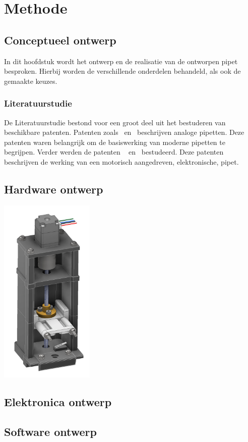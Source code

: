 \chapter{Methode}
\section{Conceptueel ontwerp}
In dit hoofdstuk wordt het ontwerp en de realisatie van de ontworpen pipet besproken. Hierbij worden de verschillende onderdelen behandeld, als ook de gemaakte keuzes. 
\subsection{Literatuurstudie}
De Literatuurstudie bestond voor een groot deel uit het bestuderen van beschikbare patenten. Patenten zoals\ \cite{RN16} en\ \cite{RN17} beschrijven analoge pipetten. Deze patenten waren belangrijk om de basiswerking van moderne pipetten te begrijpen.
Verder werden de patenten \ \cite{RN35} en\ \cite{RN36} bestudeerd. Deze patenten beschrijven de werking van een motorisch aangedreven, elektronische, pipet.
\section{Hardware ontwerp}
\begin{center}
    \includegraphics[height=9cm]{figures/FullModel.png}
\end{center}
\section{Elektronica ontwerp}
\section{Software ontwerp}

